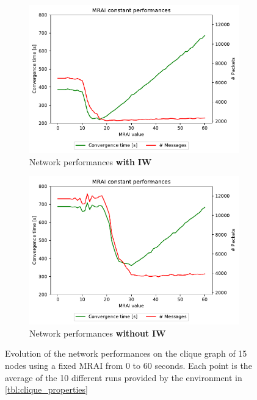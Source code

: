 \begin{figure}[h]
     \centering
     \begin{subfigure}[b]{0.49\textwidth}
         \centering
         \includegraphics[width=\textwidth]{images/clique/messagesVStime/pareto-clique-constant_mrai_evolution.pdf}
		 \caption{Network performances \textbf{with} \textbf{\ac{IW}}}
         \label{fig:clique_evolution_IW}
     \end{subfigure}
     \hfill
     \begin{subfigure}[b]{0.49\textwidth}
         \centering
         \includegraphics[width=\textwidth]{images/clique/messagesVStime/pareto-clique-noIW-constant_mrai_evolution.pdf}
		 \caption{Network performances \textbf{without} \textbf{\ac{IW}}}
         \label{fig:clique_evolution_noIW}
     \end{subfigure}
		\caption{Evolution of the network performances on the clique graph of \num{15}
			nodes using a fixed \ac{MRAI} from \num{0} to \num{60} seconds.
			Each point is the average of the \num{10} different runs provided
			by the environment in \cref{tbl:clique_properties}}
        \label{fig:clique_evolution}
\end{figure}

